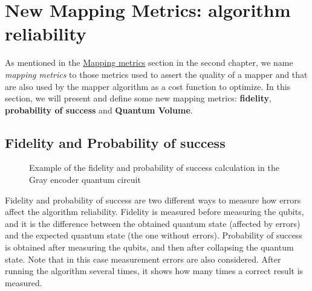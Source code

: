 \section{New Mapping Metrics: algorithm reliability}
\label{sec:org27990de}
As mentioned in the \hyperref[sec:orgc729465]{Mapping metrics} section in the second chapter, we name \emph{mapping metrics} to those metrics used to assert the quality of a mapper and that are also used by the mapper algorithm as a cost function to optimize.
In this section, we will present and  define some new mapping metrics: \textbf{fidelity}, \textbf{probability of success} and \textbf{Quantum Volume}.

\subsection{Fidelity and Probability of success}
\label{sec:org0c7b2c2}

\begin{figure}
    \centering

\caption{Example of the fidelity and probability of success calculation in the Gray encoder quantum circuit}
\label{fig:latency_swaps_ex_orig}
\end{figure}

Fidelity and probability of success  are two different ways to measure how errors affect the algorithm reliability.
Fidelity is measured before measuring the qubits, and it is the difference between the obtained quantum state (affected by errors) and the expected quantum state (the one without errors).  Probability of success is obtained after measuring the qubits, and then  after collapsing the quantum state. Note that in this case measurement errors are also considered. After running the algorithm several times, it shows how many times a correct result is measured.

